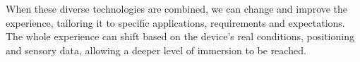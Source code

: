 When these diverse technologies are combined, we can change and improve the experience, tailoring it to specific applications, requirements and expectations. 
The whole experience can shift based on the device's real conditions, positioning and sensory data, allowing a deeper level of immersion to be reached. 


